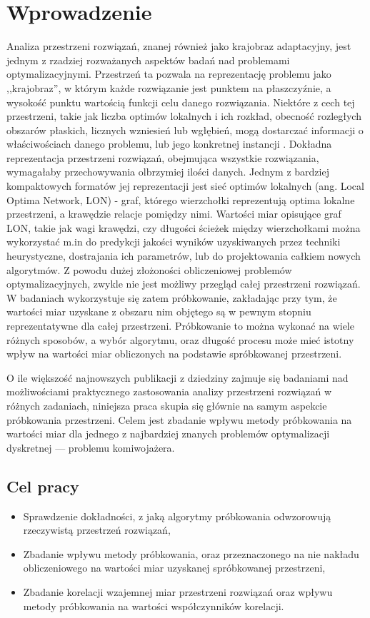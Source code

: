 \chapter{Wprowadzenie}

Analiza przestrzeni rozwiązań, znanej również jako krajobraz adaptacyjny, jest jednym z rzadziej rozważanych aspektów badań nad problemami optymalizacyjnymi.
Przestrzeń ta pozwala na reprezentację problemu jako ,,krajobraz'', w którym każde rozwiązanie jest punktem na płaszczyźnie, a wysokość punktu wartością funkcji celu
danego rozwiązania.
Niektóre z cech tej przestrzeni, takie jak liczba optimów lokalnych i ich rozkład, obecność rozległych obszarów płaskich,
licznych wzniesień lub wgłębień, mogą dostarczać informacji o właściwościach danego problemu, lub jego konkretnej instancji \cite{DBLP:journals/corr/OchoaVDT14}.
Dokładna reprezentacja przestrzeni rozwiązań, obejmująca wszystkie rozwiązania,
wymagałaby przechowywania olbrzymiej ilości danych.
Jednym z bardziej kompaktowych formatów jej reprezentacji jest sieć optimów lokalnych (ang. Local Optima Network, LON) - graf, którego wierzchołki reprezentują
optima lokalne przestrzeni, a krawędzie relacje pomiędzy nimi.
Wartości miar opisujące graf LON, takie jak wagi krawędzi, czy długości ścieżek między wierzchołkami można wykorzystać
m.in do predykcji jakości wyników uzyskiwanych przez techniki heurystyczne, dostrajania ich parametrów, lub do projektowania całkiem nowych algorytmów.
Z powodu dużej złożoności obliczeniowej problemów optymalizacyjnych, zwykle nie jest możliwy przegląd całej przestrzeni rozwiązań.
W badaniach wykorzystuje się zatem próbkowanie, zakładając przy tym, że wartości miar uzyskane z obszaru nim objętego
są w pewnym stopniu reprezentatywne dla całej przestrzeni. Próbkowanie to można wykonać na wiele różnych sposobów,
a wybór algorytmu, oraz długość procesu może mieć istotny wpływ na wartości miar obliczonych na podstawie spróbkowanej przestrzeni.

O ile większość najnowszych publikacji z dziedziny zajmuje się badaniami nad możliwościami praktycznego zastosowania analizy przestrzeni rozwiązań w różnych zadaniach,
niniejsza praca skupia się głównie na samym aspekcie próbkowania przestrzeni.
Celem jest zbadanie wpływu metody próbkowania na wartości miar dla jednego z najbardziej znanych
problemów optymalizacji dyskretnej --- problemu komiwojażera.

\section{Cel pracy}
\begin{itemize}
    \item Sprawdzenie dokładności, z jaką algorytmy próbkowania odwzorowują rzeczywistą przestrzeń rozwiązań,
    \item Zbadanie wpływu metody próbkowania, oraz przeznaczonego na nie nakładu obliczeniowego na wartości miar uzyskanej spróbkowanej przestrzeni,
    \item Zbadanie korelacji wzajemnej miar przestrzeni rozwiązań oraz wpływu metody próbkowania na wartości współczynników korelacji.
\end{itemize}

